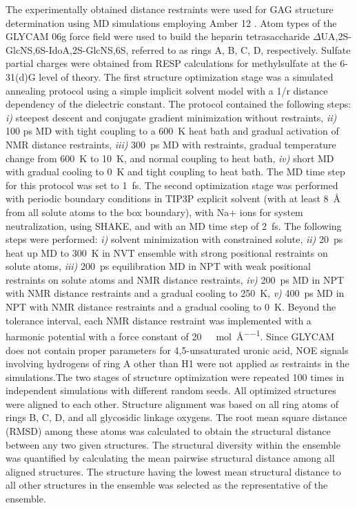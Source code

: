 The experimentally obtained  distance restraints were used for GAG structure
determination using MD simulations employing Amber 12 \cite{case_amber_12}. Atom
types of the GLYCAM 06g force field \cite{kirschner_glycam06:_2008} were used to
build the heparin tetrasaccharide $\Delta$UA,2S-GlcNS,6S-IdoA,2S-GlcNS,6S,
referred to as rings A, B, C, D, respectively. Sulfate partial charges were
obtained from RESP calculations for methylsulfate at the 6-31(d)G level of
theory. The first structure optimization stage was a simulated annealing
protocol using a simple implicit solvent model with a 1/r distance dependency of
the dielectric constant. The protocol contained the following steps: \textit{i)}
steepest descent and conjugate gradient minimization without restraints,
\textit{ii)} 100 ps MD with tight coupling to a \SI{600}{\kelvin} heat bath and
gradual activation of NMR distance restraints, \textit{iii)}
\SI{300}{\pico\second} MD with restraints, gradual temperature change from
\SI{600}{\kelvin} to \SI{10}{\kelvin}, and normal coupling to heat bath,
\textit{iv)} short MD with gradual cooling to \SI{0}{\kelvin} and tight coupling
to heat bath. The MD time step for this protocol was set to
\SI{1}{\femto\second}. The second optimization stage was performed with periodic
boundary conditions in TIP3P explicit solvent (with at least \SI{8}{\angstrom}
from all solute atoms to the box boundary), with Na+ ions for system
neutralization, using SHAKE, and with an MD time step of \SI{2}{\femto\second}.
The following steps were performed: \textit{i)} solvent minimization with
constrained solute, \textit{ii)} \SI{20}{\pico\second} heat up MD to
\SI{300}{\kelvin} in NVT ensemble with strong positional restraints on solute
atoms, \textit{iii)} \SI{200}{\pico\second} equilibration MD in NPT with weak
positional restraints on solute atoms and NMR distance restraints, \textit{iv)}
\SI{200}{\pico\second} MD in NPT with NMR distance restraints and a gradual
cooling to \SI{250}{\kelvin}, \textit{v)} \SI{400}{\pico\second} MD in NPT with
NMR distance restraints and a gradual cooling to \SI{0}{\kelvin}. Beyond the
tolerance interval, each NMR distance restraint was implemented with a harmonic
potential with a force constant of \SI{20}{\kilo\calory\per\mole\per\angstrom}.
Since GLYCAM does not contain proper parameters for 4,5-unsaturated uronic acid,
NOE signals involving hydrogens of ring A other than H1 were not applied as
restraints in the simulations.The two stages of structure optimization were
repeated 100 times in independent simulations with different random seeds. All
optimized structures were aligned to each other. Structure alignment was based
on all ring atoms of rings B, C, D, and all glycosidic linkage oxygens. The root
mean square distance (RMSD) among these atoms was calculated to obtain the
structural distance between any two given structures. The structural diversity
within the ensemble was quantified by calculating the mean pairwise structural
distance among all aligned structures. The structure having the lowest mean
structural distance to all other structures in the ensemble was selected as the
representative of the ensemble.

